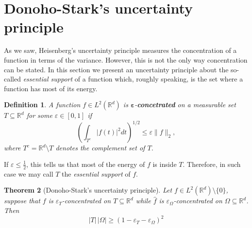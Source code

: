 \documentclass[corpo=11pt, stile=classica, tipotesi=custom,
greek, evenboxes, english]{toptesi}
\numberwithin{equation}{chapter}
\newtheorem{teo}{Theorem}[chapter] %
\newtheorem{defi}[teo]{Definition}
\theoremstyle{definition}
\theoremstyle{remark}
\newcommand{\R}{\mathbb{R}} %
\begin{document}
\section{Donoho-Stark's uncertainty principle}\label{section Donoho-Stark's UP}
As we saw, Heisenberg's uncertainty principle measures the concentration of a function in terms of the variance. However, this is not the only way concentration can be stated. In this section we present an uncertainty principle about the so-called \emph{essential support} of a function which, roughly speaking, is the set where a function has most of its energy.
\begin{defi}\label{epsilon-concetrated def}
	A function $f \in L^2(\R^d)$ is $\mathbf{\varepsilon}$-\textbf{concetrated} on a measurable set $T \subseteq \R^d$ for some $\varepsilon \in [0,1]$ if
	\begin{equation*}
		\left(\int_{T^c} |f(t)|^2 dt \right)^{1/2} \leq \varepsilon \| f \|_2,
	\end{equation*}
	where $T^c = \R^d \setminus T$ denotes the complement set of $T$.
\end{defi}
If $\varepsilon \leq \frac{1}{2}$, this tells us that most of the energy of $f$ is inside $T$. Therefore, in such case we may call $T$ the \emph{essential support} of $f$.
\begin{teo}[Donoho-Stark's uncertainty principle]\label{Donoho-Stark's uncertainty principle theorem}
	Let $f \in L^2(\R^d) \setminus \{0\}$, suppose that $f$ is $\varepsilon_T$-concentrated on $T \subseteq \R^d$ while $\hat{f}$ is $\varepsilon_{\Omega}$-concentrated on $\Omega \subseteq \R^d$. Then
	\begin{equation}\label{Donoho-Stark's uncertainty principle formula}
		|T| \, |\Omega| \geq (1 - \varepsilon_T - \varepsilon_{\Omega})^2
	\end{equation}
\end{teo}
\end{document}

